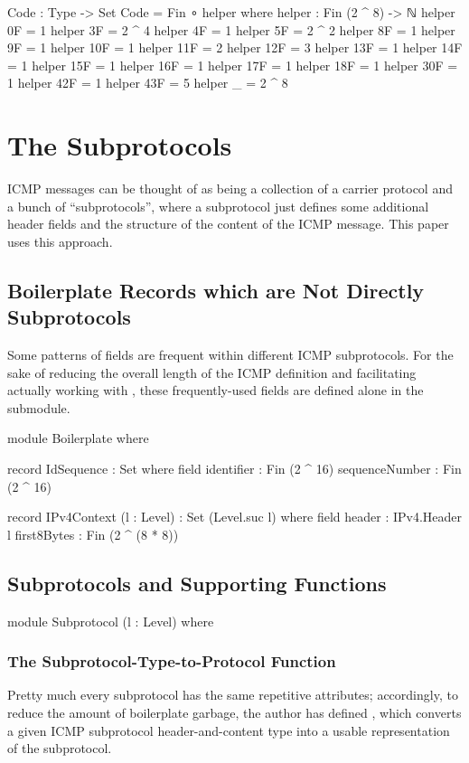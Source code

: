 \documentclass{report}
\begin{document}
\begin{itemize}
\begin{code}
  Code : Type -> Set
  Code = Fin ∘ helper
    where
    helper : Fin (2 ^ 8) -> ℕ
    helper 0F = 1
    helper 3F = 2 ^ 4
    helper 4F = 1
    helper 5F = 2 ^ 2
    helper 8F = 1
    helper 9F = 1
    helper 10F = 1
    helper 11F = 2
    helper 12F = 3
    helper 13F = 1
    helper 14F = 1
    helper 15F = 1
    helper 16F = 1
    helper 17F = 1
    helper 18F = 1
    helper 30F = 1
    helper 42F = 1
    helper 43F = 5
    helper _ = 2 ^ 8
\end{code}

\section{The Subprotocols}
ICMP messages can be thought of as being a collection of a carrier protocol and a bunch of ``subprotocols'', where a subprotocol just defines some additional header fields and the structure of the content of the ICMP message.  This paper uses this approach.

\subsection{Boilerplate Records which are Not Directly Subprotocols}
Some patterns of fields are frequent within different ICMP subprotocols.  For the sake of reducing the overall length of the ICMP definition and facilitating actually working with , these frequently-used fields are defined alone in the  submodule.

\begin{code}
  module Boilerplate where

    record IdSequence : Set where
      field
        identifier : Fin (2 ^ 16)
        sequenceNumber : Fin (2 ^ 16)

    record IPv4Context (l : Level) : Set (Level.suc l) where
      field
        header : IPv4.Header l
        first8Bytes : Fin (2 ^ (8 * 8))
\end{code}


\subsection{Subprotocols and Supporting Functions}

\begin{code}
  module Subprotocol (l : Level) where
\end{code}

\subsubsection{The Subprotocol-Type-to-Protocol Function}
Pretty much every subprotocol has the same repetitive  attributes; accordingly, to reduce the amount of boilerplate garbage, the author has defined , which converts a given ICMP subprotocol header-and-content type into a usable representation of the subprotocol.


\end{itemize}
\end{document}
